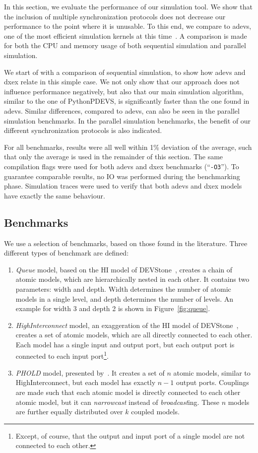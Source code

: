 In this section, we evaluate the performance of our simulation tool.
We show that the inclusion of multiple synchronization protocols does not decrease our performance to the point where it is unusable.
To this end, we compare to adevs, one of the most efficient simulation kernels at this time~\cite{DEVSSurvey}.
A comparison is made for both the CPU and memory usage of both sequential simulation and parallel simulation.

We start of with a comparison of sequential simulation, to show how adevs and dxex relate in this simple case.
We not only show that our approach does not influence performance negatively, but also that our main simulation algorithm, similar to the one of PythonPDEVS, is significantly faster than the one found in adevs.
Similar differences, compared to adevs, can also be seen in the parallel simulation benchmarks.
In the parallel simulation benchmarks, the benefit of our different synchronization protocols is also indicated.

For all benchmarks, results were all well within 1\% deviation of the average, such that only the average is used in the remainder of this section.
The same compilation flags were used for both adevs and dxex benchmarks (``\texttt{-O3}'').
To guarantee comparable results, no IO was performed during the benchmarking phase.
Simulation traces were used to verify that both adevs and dxex models have exactly the same behaviour.

\subsection{Benchmarks}
We use a selection of benchmarks, based on those found in the literature.
Three different types of benchmark are defined:
\begin{enumerate}
    \item \textit{Queue} model, based on the HI model of DEVStone~\cite{DEVStone}, creates a chain of atomic models, which are hierarchically nested in each other.
          It contains two parameters: width and depth.
          Width determines the number of atomic models in a single level, and depth determines the number of levels.
          An example for width 3 and depth 2 is shown in Figure~\ref{fig:queue}.
    \item \textit{HighInterconnect} model, an exaggeration of the HI model of DEVStone~\cite{DEVStone}, creates a set of atomic models, which are all directly connected to each other.
          Each model has a single input and output port, but each output port is connected to each input port\footnote{Except, of course, that the output and input port of a single model are not connected to each other.}.
    \item \textit{PHOLD} model, presented by~\cite{PHOLD}.
          It creates a set of $n$ atomic models, similar to HighInterconnect, but each model has exactly $n-1$ output ports.
          Couplings are made such that each atomic model is directly connected to each other atomic model, but it can \textit{narrowcast} instead of \textit{broadcast}ing.
          These $n$ models are further equally distributed over $k$ coupled models.
\end{enumerate}

